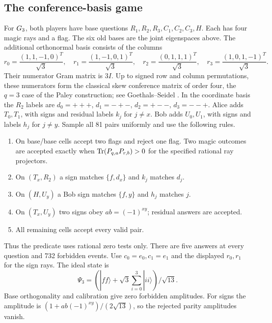 \subsection{The conference-basis game}
For $G_3$, both players have base questions $R_1,R_2,R_3,C_1,C_2,C_3,H$. Each has four magic rays and a flag. The six old bases are the joint eigenspaces above. The additional orthonormal basis consists of the columns
\[
 r_0=\frac{(1,1,-1,0)^T}{\sqrt3},\quad
 r_1=\frac{(1,-1,0,1)^T}{\sqrt3},\quad
 r_2=\frac{(0,1,1,1)^T}{\sqrt3},\quad
 r_3=\frac{(1,0,1,-1)^T}{\sqrt3}.
\]
Their numerator Gram matrix is $3I$. Up to signed row and column permutations, these numerators form the classical skew conference matrix of order four, the $q=3$ case of the Paley construction; see Goethals--Seidel \cite[Section 2, Theorem 2.1]{Conference}. In the coordinate basis the $R_2$ labels are $d_0=+++$, $d_1=-+-$, $d_2=+--$, $d_3=--+$. Alice adds $T_0,T_1$, with signs and residual labels $k_j$ for $j\ne x$. Bob adds $U_0,U_1$, with signs and labels $h_j$ for $j\ne y$. Sample all 81 pairs uniformly and use the following rules.
\begin{enumerate}
\item On base/base cells accept two flags and reject one flag. Two magic outcomes are accepted exactly when $\operatorname{Tr}(P_{q,a}P_{r,b})>0$ for the specified rational ray projectors.
\item On $(T_x,R_2)$ a sign matches $\{f,d_x\}$ and $k_j$ matches $d_j$.
\item On $(H,U_y)$ a Bob sign matches $\{f,y\}$ and $h_j$ matches $j$.
\item On $(T_x,U_y)$ two signs obey $ab=(-1)^{xy}$; residual answers are accepted.
\item All remaining cells accept every valid pair.
\end{enumerate}
Thus the predicate uses rational zero tests only. There are five answers at every question and 732 forbidden events. Use $c_0=e_0,c_1=e_1$ and the displayed $r_0,r_1$ for the sign rays. The ideal state is
\[
 \Psi_3=(|ff\rangle+\sqrt3\sum_{i=0}^3|ii\rangle)/\sqrt{13}.
\]
Base orthogonality and calibration give zero forbidden amplitudes. For signs the amplitude is $(1+ab(-1)^{xy})/(2\sqrt{13})$, so the rejected parity amplitudes vanish.

